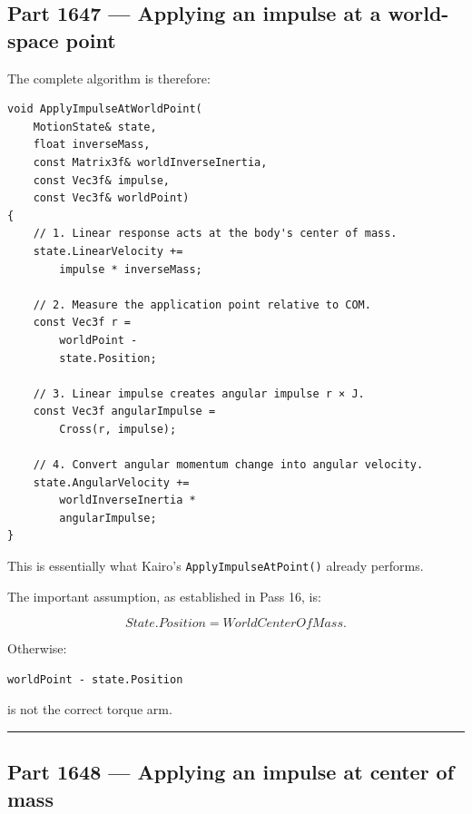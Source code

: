 \subsection{Part 1647 --- Applying an impulse at a world-space point}\label{06-engine-ii-ch036-part-1647-applying-an-impulse-at-a-world-space-point}

\hypertarget{06-engine-ii-ch036-part-1647-applying-an-impulse-at-a-world-space-point}{}

The complete algorithm is therefore:

\begin{verbatim}
void ApplyImpulseAtWorldPoint(
    MotionState& state,
    float inverseMass,
    const Matrix3f& worldInverseInertia,
    const Vec3f& impulse,
    const Vec3f& worldPoint)
{
    // 1. Linear response acts at the body's center of mass.
    state.LinearVelocity +=
        impulse * inverseMass;

    // 2. Measure the application point relative to COM.
    const Vec3f r =
        worldPoint -
        state.Position;

    // 3. Linear impulse creates angular impulse r × J.
    const Vec3f angularImpulse =
        Cross(r, impulse);

    // 4. Convert angular momentum change into angular velocity.
    state.AngularVelocity +=
        worldInverseInertia *
        angularImpulse;
}
\end{verbatim}

This is essentially what Kairo's \texttt{ApplyImpulseAtPoint()} already performs.

The important assumption, as established in Pass 16, is:

\[
\boxed{
State.Position
=
WorldCenterOfMass.
}
\]

Otherwise:

\begin{verbatim}
worldPoint - state.Position
\end{verbatim}

is not the correct torque arm.

\begin{center}\rule{0.5\linewidth}{0.5pt}\end{center}

\subsection{Part 1648 --- Applying an impulse at center of mass}\label{06-engine-ii-ch036-part-1648-applying-an-impulse-at-center-of-mass}

